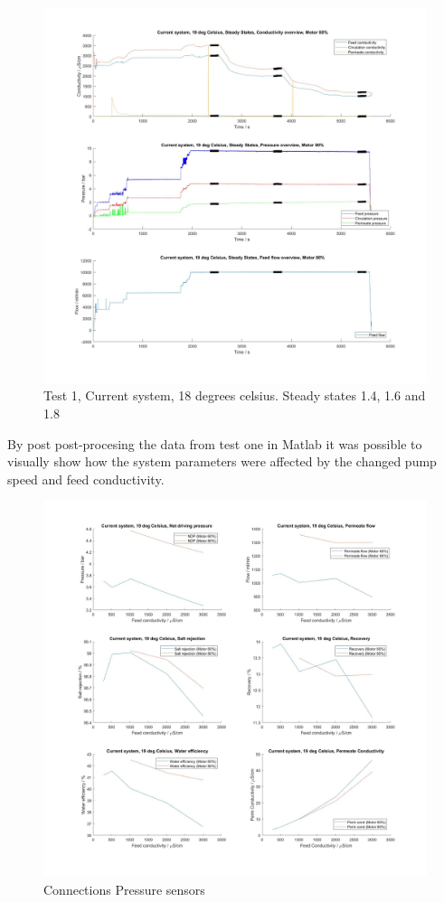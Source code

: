 \begin{figure}[H]
    \centering
    \includegraphics[width=1.1\textwidth]{overview20_80}
    \caption{Test 1, Current system, 18 degrees celsius. Steady states 1.4, 1.6 and 1.8}
    \label{fig:PressConn}
\end{figure}

\newpage

By post post-procesing the data from test one in Matlab it was possible to visually show how the system parameters were affected by the changed pump speed and feed conductivity. 

\begin{figure}[H]
    \centering
    \includegraphics[width=1.1\textwidth]{Key20}
    \caption{Connections Pressure sensors}
    \label{fig:PressConn}
\end{figure}

